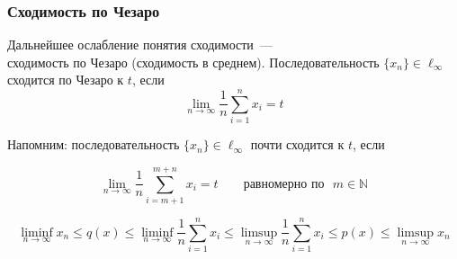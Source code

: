 \begin{frame}\frametitle{Сходимость по Чезаро}
	Дальнейшее ослабление понятия сходимости~---
	\\
	сходимость по Чезаро (сходимость в среднем).
	\vfill
	Последовательность $\{x_n\}\in\ell_\infty$ сходится по Чезаро к $t$, если
	\begin{equation}
		\lim_{n\to\infty}\frac1{n}\sum_{i=1}^n x_i = t
	\end{equation}

	Напомним: последовательность $\{x_n\}\in\ell_\infty$ почти сходится к $t$, если

	\begin{equation}
			\lim_{n\to\infty}  \frac1{n}\sum_{i=m+1}^{m+n} x_i = t
			\qquad
			\mbox{равномерно по~~}
			m\in\mathbb{N}
	\end{equation}

	\vfill

	\begin{equation}
		\label{eq:generalization_of_limits}
		\liminf_{n\to\infty} x_n \leq q(x) \leq \liminf_{n\to\infty}\frac1{n}\sum_{i=1}^n x_i
		\leq
		\limsup_{n\to\infty}\frac1{n}\sum_{i=1}^n x_i
		\leq p(x)
		\leq \limsup_{n\to\infty} x_n
	\end{equation}

\end{frame}


